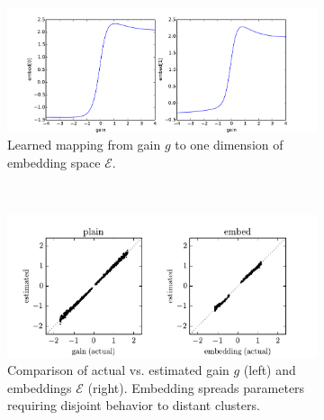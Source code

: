 \documentclass{article}
\newcommand{\latset}{\mathcal{E}}
\begin{document}
\begin{figure}
    \centering
    \begin{subfigure}[b]{0.24\textwidth}
\includegraphics[trim={13.7cm -1cm 2cm -1.0cm}, clip, width=\textwidth]{pointmass_embed_mapping.pdf}
        \caption{Learned mapping from gain $g$ to one dimension of embedding space $\latset$.
        }
        \label{embed-mapping}
    \end{subfigure}
    ~ %
    \begin{subfigure}[b]{0.48\textwidth}
\includegraphics[trim={0.5cm 0 1cm 1.2cm}, clip, width=\textwidth]{pointmass_embed_scatter.pdf}
        \caption{
Comparison of actual vs. estimated gain $g$ (left) and embeddings $\latset$ (right).
Embedding spreads parameters requiring disjoint behavior to distant clusters.
        }
        \label{embed-scatter}
    \end{subfigure}
    ~ %
    \begin{subfigure}[b]{0.23\textwidth}

\end{subfigure}
\end{figure}
\end{document}
